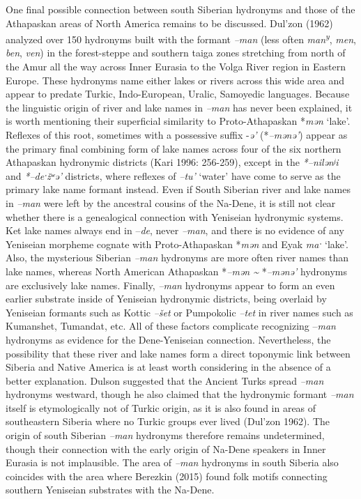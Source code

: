 One final possible connection between south Siberian hydronyms and those of the Athapaskan areas of North America remains to be discussed. Dul’zon (1962) analyzed over 150 hydronyms built with the formant \textit{–man }(less often\textit{ man}\textit{\textsuperscript{y}},\textit{ men},\textit{ ben},\textit{ ven}) in the forest-steppe and southern taiga zones stretching from north of the Amur all the way across Inner Eurasia to the Volga River region in Eastern Europe. These hydronyms name either lakes or rivers across this wide area and appear to predate Turkic, Indo-European, Uralic, Samoyedic languages. Because the linguistic origin of river and lake names in \textit{–man }has never been explained, it is worth mentioning their superficial similarity to Proto-Athapaskan *\textit{mən} ‘lake’. Reflexes of this root, sometimes with a possessive suffix -\textit{ə’} (*\textit{–mənə’}) appear as the primary final combining form of lake names across four of the six northern Athapaskan hydronymic districts (Kari 1996: 256-259), except in the \textit{*–nilənʲi} and \textit{*–deˑžʷə’ }districts, where reflexes of \textit{–tu’} ‘water’ have come to serve as the primary lake name formant instead. Even if South Siberian river and lake names in \textit{–man }were left by the ancestral cousins of the Na-Dene, it is still not clear whether there is a genealogical connection with Yeniseian hydronymic systems. Ket lake names always end in –\textit{de}, never \textit{–man}, and there is no evidence of any Yeniseian morpheme cognate with Proto-Athapaskan *\textit{mən} and Eyak \textit{maˑ} ‘lake’. Also, the mysterious Siberian \textit{–man} hydronyms are more often river names than lake names, whereas North American Athapaskan *\textit{–mən \~{}} *\textit{–mənə’} hydronyms are exclusively lake names. Finally, \textit{–man} hydronyms appear to form an even earlier substrate inside of Yeniseian hydronymic districts, being overlaid by Yeniseian formants such as Kottic \textit{–šet} or Pumpokolic \textit{–tet} in river names such as Kumanshet, Tumandat, etc. All of these factors complicate recognizing –\textit{man} hydronyms as evidence for the Dene-Yeniseian connection. Nevertheless, the possibility that these river and lake names form a direct toponymic link between Siberia and Native America is at least worth considering in the absence of a better explanation. Dulson suggested that the Ancient Turks spread \textit{–man} hydronyms westward, though he also claimed that the hydronymic formant \textit{–man} itself is etymologically not of Turkic origin, as it is also found in areas of southeastern Siberia where no Turkic groups ever lived (Dul’zon 1962). The origin of south Siberian \textit{–man} hydronyms therefore remains undetermined, though their connection with the early origin of Na-Dene speakers in Inner Eurasia is not implausible. The area of \textit{–man} hydronyms in south Siberia also coincides with the area where Berezkin (2015) found folk motifs connecting southern Yeniseian substrates with the Na-Dene.


